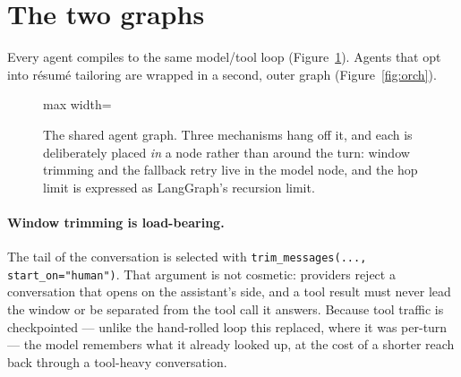 \documentclass[11pt,a4paper]{article}
\begin{document}
\section{The two graphs}

Every agent compiles to the same model/tool loop (Figure~\ref{fig:loop}). Agents that opt
into résumé tailoring are wrapped in a second, outer graph (Figure~\ref{fig:orch}).

\begin{figure}[!ht]
\centering
\begin{adjustbox}{max width=\textwidth}
\end{adjustbox}
\caption{The shared agent graph. Three mechanisms hang off it, and each is deliberately
placed \emph{in} a node rather than around the turn: window trimming and the fallback retry
live in the model node, and the hop limit is expressed as LangGraph's recursion limit.}
\label{fig:loop}
\end{figure}

\paragraph{Window trimming is load-bearing.} The tail of the conversation is selected with
\texttt{trim\_\allowbreak{}messages(..., start\_\allowbreak{}on="human")}. That argument is not cosmetic: providers
reject a conversation that opens on the assistant's side, and a tool result must never lead
the window or be separated from the tool call it answers. Because tool traffic is
checkpointed --- unlike the hand-rolled loop this replaced, where it was per-turn --- the
model remembers what it already looked up, at the cost of a shorter reach back through a
tool-heavy conversation.
\end{document}
